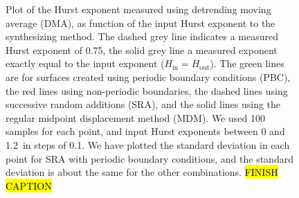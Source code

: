 \begin{figure}[!htb]%
    \centering%
    {
        \newcommand{\f}{\footnotesize}%
        \newcommand{\x}{\text}%
        \newcommand{\hh}{{\f $H_\x{in}=H_\x{out}$}}%
    }
    \caption[%
        Plot of the Hurst exponent measured using detrending moving average (DMA), as function of the input Hurst exponent to the synthesizing method. The dashed grey line indicates a measured Hurst exponent of 0.75, the solid grey line a measured exponent exactly equal to the input exponent ($H_\text{in} = H_\text{out}$). The green lines are for surfaces created using periodic boundary conditions (PBC), the red lines using non-periodic boundaries, the dashed lines using successive random additions (SRA), and the solid lines using the regular midpoint displacement method (MDM). We used 100 samples for each point, and input Hurst exponents between 0 and 1.2 in steps of 0.1. We have plotted the standard deviation in each point for SRA with periodic boundary conditions, and the standard deviation is about the same for the other combinations. %
    ]{%
        Plot of the Hurst exponent measured using detrending moving average (DMA), as function of the input Hurst exponent to the synthesizing method. The dashed grey line indicates a measured Hurst exponent of 0.75, the solid grey line a measured exponent exactly equal to the input exponent ($H_\text{in} = H_\text{out}$). The green lines are for surfaces created using periodic boundary conditions (PBC), the red lines using non-periodic boundaries, the dashed lines using successive random additions (SRA), and the solid lines using the regular midpoint displacement method (MDM). We used 100 samples for each point, and input Hurst exponents between 0 and 1.2\protect\footnotemark\ in steps of 0.1. We have plotted the standard deviation in each point for SRA with periodic boundary conditions, and the standard deviation is about the same for the other combinations. %
        \hl{FINISH CAPTION} %
        \label{fig:diamond_square_testing}%
    }%

\end{figure}
